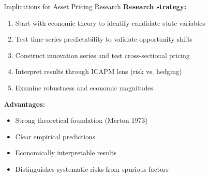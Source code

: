 \documentclass{beamer}
\begin{document}
\begin{frame}{Implications for Asset Pricing Research}
\textbf{Research strategy:}

\begin{enumerate}
\item Start with economic theory to identify candidate state variables
\vspace{0.2cm}

\item Test time-series predictability to validate opportunity shifts
\vspace{0.2cm}

\item Construct innovation series and test cross-sectional pricing
\vspace{0.2cm}

\item Interpret results through ICAPM lens (risk vs. hedging)
\vspace{0.2cm}

\item Examine robustness and economic magnitudes
\end{enumerate}

\vspace{0.3cm}
\textbf{Advantages:}
\begin{itemize}
\item Strong theoretical foundation (Merton 1973)
\item Clear empirical predictions
\item Economically interpretable results
\item Distinguishes systematic risks from spurious factors
\end{itemize}
\end{frame}
\end{document}
